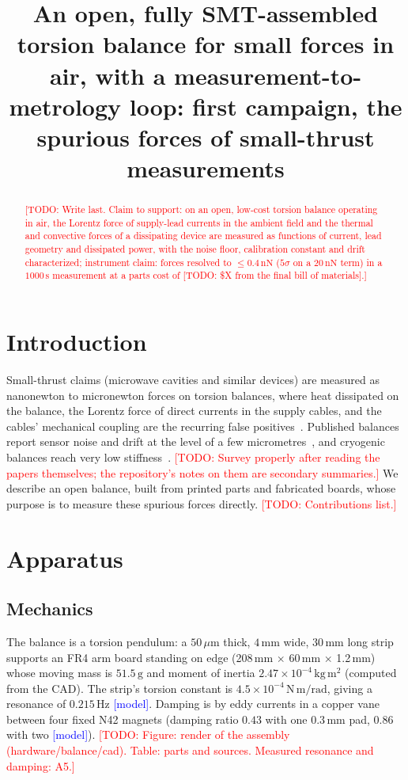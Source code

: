 \documentclass[11pt]{article}
\title{An open, fully SMT-assembled torsion balance for small forces in air, with a measurement-to-metrology loop: first campaign, the spurious forces of small-thrust measurements}
\author{\todo{authors and affiliations}}
\date{\todo{date}}
\newcommand{\todo}[1]{\textcolor{red}{[TODO: #1]}}
\newcommand{\model}{\textcolor{blue}{[model]}}
\begin{document}
\maketitle

\begin{abstract}
\todo{Write last. Claim to support: on an open, low-cost torsion balance operating in air, the Lorentz force of supply-lead currents in the ambient field and the thermal and convective forces of a dissipating device are measured as functions of current, lead geometry and dissipated power, with the noise floor, calibration constant and drift characterized; instrument claim: forces resolved to $\le 0.4\,\mathrm{nN}$ ($5\sigma$ on a $20\,\mathrm{nN}$ term) in a $1000\,\mathrm{s}$ measurement at a parts cost of \todo{\$X from the final bill of materials}.}
\end{abstract}

\section{Introduction}
Small-thrust claims (microwave cavities and similar devices) are measured as nanonewton to micronewton forces on torsion balances, where heat dissipated on the balance, the Lorentz force of direct currents in the supply cables, and the cables' mechanical coupling are the recurring false positives~\cite{duif2017}. Published balances report sensor noise and drift at the level of a few micrometres~\cite{soni2013}, and cryogenic balances reach very low stiffness~\cite{cryo2022}. \todo{Survey properly after reading the papers themselves; the repository's notes on them are secondary summaries.}
We describe an open balance, built from printed parts and fabricated boards, whose purpose is to measure these spurious forces directly. \todo{Contributions list.}

\section{Apparatus}
\subsection{Mechanics}
The balance is a torsion pendulum: a $50\,\mu\mathrm{m}$ thick, $4\,\mathrm{mm}$ wide, $30\,\mathrm{mm}$ long strip supports an FR4 arm board standing on edge (208\,mm $\times$ 60\,mm $\times$ 1.2\,mm) whose moving mass is $51.5\,\mathrm{g}$ and moment of inertia $2.47\times10^{-4}\,\mathrm{kg\,m^2}$ (computed from the CAD). The strip's torsion constant is $4.5\times10^{-4}\,\mathrm{N\,m/rad}$, giving a resonance of $0.215\,\mathrm{Hz}$ \model. Damping is by eddy currents in a copper vane between four fixed N42 magnets (damping ratio $0.43$ with one $0.3\,\mathrm{mm}$ pad, $0.86$ with two \model). \todo{Figure: render of the assembly (hardware/balance/cad). Table: parts and sources. Measured resonance and damping: A5.}
\end{document}
